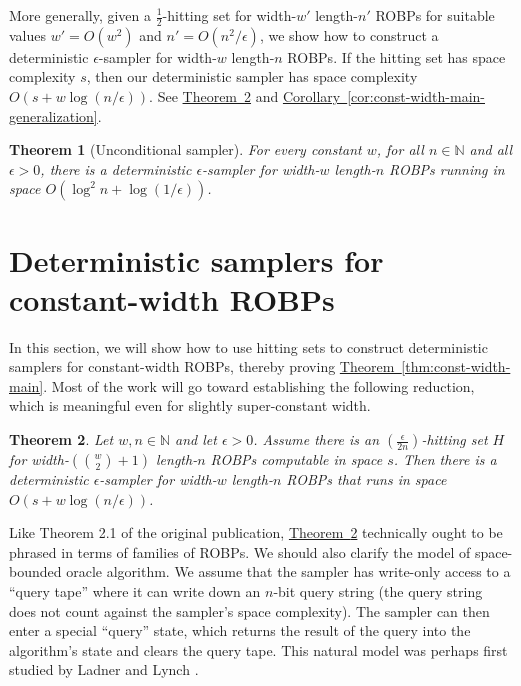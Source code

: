 \documentclass[10pt,a4paper]{article}
\newtheorem{theorem}{Theorem}[section]
\newcommand{\N}{\mathbb N}
\newcommand{\expref}[2]{\hyperref[#2]{#1~\ref*{#2}}}
\begin{document}
More generally, given a $\frac{1}{2}$-hitting set for width-$w'$ length-$n'$ ROBPs for suitable values $w' = O(w^2)$ and $n' = O(n^2/\epsilon)$, we show how to construct a deterministic $\epsilon$-sampler for width-$w$ length-$n$ ROBPs. If the hitting set has space complexity $s$, then our deterministic sampler has space complexity $O(s + w \log(n/\epsilon))$. See \expref{Theorem}{thm:const-width-reduction} and \expref{Corollary}{cor:const-width-main-generalization}.

\begin{theorem}[Unconditional sampler] \label{thm:hz-sampler}
For every constant $w$, for all $n \in \N$ and all $\epsilon > 0$, there is a deterministic $\epsilon$-sampler for width-$w$ length-$n$ ROBPs running in space $O(\log^2 n + \log(1/\epsilon))$.
\end{theorem}

\setcounter{section}{2}
\section{Deterministic samplers for constant-width ROBPs} \label{sec:constwidth}

In this section, we will show how to use hitting sets to construct deterministic samplers for constant-width ROBPs, thereby proving \expref{Theorem}{thm:const-width-main}. Most of the work will go toward establishing the following reduction, which is meaningful even for slightly super-constant width.

\begin{theorem} \label{thm:const-width-reduction}
Let $w, n \in \N$ and let $\epsilon > 0$. Assume there is an $(\frac{\epsilon}{2n})$-hitting set $H$ for width-$(\binom{w}{2} + 1)$ length-$n$ ROBPs computable in space $s$. Then there is a deterministic $\epsilon$-sampler for width-$w$ length-$n$ ROBPs that runs in space $O(s + w \log(n/\epsilon))$.
\end{theorem}

Like Theorem 2.1 of the original publication, \expref{Theorem}{thm:const-width-reduction} technically ought to be phrased in terms of families of ROBPs. We should also clarify the model of space-bounded oracle algorithm. We assume that the sampler has write-only access to a ``query tape'' where it can write down an $n$-bit query string (the query string does not count against the sampler's space complexity). The sampler can then enter a special ``query'' state, which returns the result of the query into the algorithm's state and clears the query tape. This natural model was perhaps first studied by Ladner and Lynch \cite{LL76}.
\end{document}
